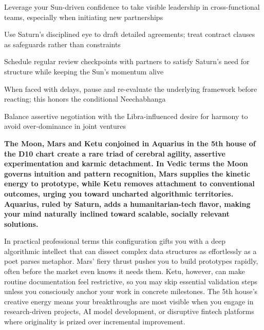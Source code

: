\begin{diamondlist}
  \item {\fontsize{8.5}{12}\selectfont Leverage your Sun-driven confidence to take visible leadership in cross-functional teams, especially when initiating new partnerships}
  \item {\fontsize{8.5}{12}\selectfont Use Saturn's disciplined eye to draft detailed agreements; treat contract clauses as safeguards rather than constraints}
  \item {\fontsize{8.5}{12}\selectfont Schedule regular review checkpoints with partners to satisfy Saturn's need for structure while keeping the Sun's momentum alive}
  \item {\fontsize{8.5}{12}\selectfont When faced with delays, pause and re-evaluate the underlying framework before reacting; this honors the conditional Neechabhanga}
  \item {\fontsize{8.5}{12}\selectfont Balance assertive negotiation with the Libra-influenced desire for harmony to avoid over-dominance in joint ventures}
\end{diamondlist}


\label{topic30}

{\fontsize{9.5}{13.8}\selectfont\bfseries\color{DeepSlate} The Moon, Mars and Ketu conjoined in Aquarius in the 5th house of the D10 chart create a rare triad of cerebral agility, assertive experimentation and karmic detachment. In Vedic terms the Moon governs intuition and pattern recognition, Mars supplies the kinetic energy to prototype, while Ketu removes attachment to conventional outcomes, urging you toward uncharted algorithmic territories. Aquarius, ruled by Saturn, adds a humanitarian-tech flavor, making your mind naturally inclined toward scalable, socially relevant solutions.}\par\vspace{2mm}

{\fontsize{9}{13}\selectfont In practical professional terms this configuration gifts you with a deep algorithmic intellect that can dissect complex data structures as effortlessly as a poet parses metaphor. Mars' fiery thrust pushes you to build prototypes rapidly, often before the market even knows it needs them. Ketu, however, can make routine documentation feel restrictive, so you may skip essential validation steps unless you consciously anchor your work in concrete milestones. The 5th house's creative energy means your breakthroughs are most visible when you engage in research-driven projects, AI model development, or disruptive fintech platforms where originality is prized over incremental improvement.}\par\vspace{1.8mm}

